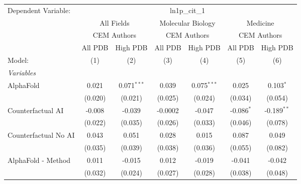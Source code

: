 \begingroup
\centering
\begin{tabular}{lcccccc}
   \tabularnewline \midrule \midrule
   Dependent Variable: & \multicolumn{6}{c}{ln1p\_cit\_1}\\
 & \multicolumn{2}{c}{All Fields} & \multicolumn{2}{c}{Molecular Biology} & \multicolumn{2}{c}{Medicine} \\
\cmidrule(lr){2-3} \cmidrule(lr){4-5} \cmidrule(lr){6-7}
 & \multicolumn{2}{c}{CEM Authors} & \multicolumn{2}{c}{CEM Authors} & \multicolumn{2}{c}{CEM Authors} \\
\cmidrule(lr){2-3} \cmidrule(lr){4-5} \cmidrule(lr){6-7}
 & \multicolumn{1}{c}{All PDB} & \multicolumn{1}{c}{High PDB} & \multicolumn{1}{c}{All PDB} & \multicolumn{1}{c}{High PDB} & \multicolumn{1}{c}{All PDB} & \multicolumn{1}{c}{High PDB} \\
\cmidrule(lr){2-2} \cmidrule(lr){3-3} \cmidrule(lr){4-4} \cmidrule(lr){5-5} \cmidrule(lr){6-6} \cmidrule(lr){7-7}
   Model:                                                     & (1)     & (2)           & (3)     & (4)           & (5)           & (6)\\  
   \midrule
   \emph{Variables}\\
   AlphaFold                                                  & 0.021   & 0.071$^{***}$ & 0.039   & 0.075$^{***}$ & 0.025         & 0.103$^{*}$\\   
                                                              & (0.020) & (0.021)       & (0.025) & (0.024)       & (0.034)       & (0.054)\\   
   Counterfactual AI                                          & -0.008  & -0.039        & -0.0002 & -0.047        & -0.086$^{*}$  & -0.189$^{**}$\\   
                                                              & (0.022) & (0.035)       & (0.026) & (0.033)       & (0.046)       & (0.078)\\   
   Counterfactual No AI                                       & 0.043   & 0.051         & 0.028   & 0.015         & 0.087         & 0.049\\   
                                                              & (0.035) & (0.039)       & (0.038) & (0.036)       & (0.055)       & (0.082)\\   
   AlphaFold - Method                                         & 0.011   & -0.015        & 0.012   & -0.019        & -0.041        & -0.042\\   
                                                              & (0.032) & (0.024)       & (0.027) & (0.028)       & (0.038)       & (0.048)\\   

\end{tabular}
